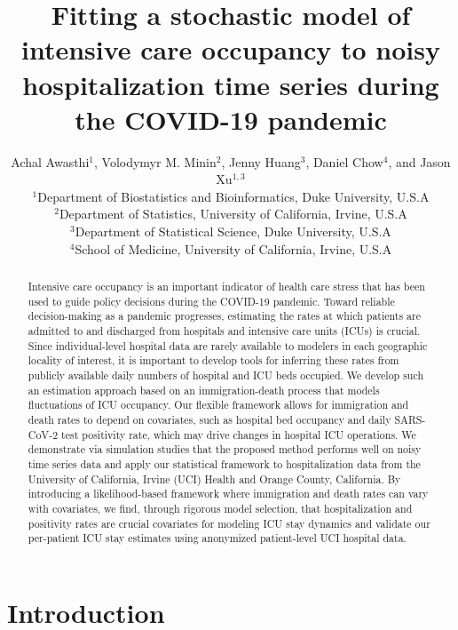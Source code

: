 \documentclass{article}
\title{Fitting a stochastic model of intensive care occupancy to noisy hospitalization time series during the COVID-19 pandemic}
\author{Achal Awasthi$^{1}$, 
Volodymyr M. Minin$^{2}$, Jenny Huang$^{3}$, Daniel Chow$^{4}$, and  Jason Xu$^{1,3}$ \\
$^{1}$Department of Biostatistics and Bioinformatics, Duke University, U.S.A\\
$^{2}$Department of Statistics, University of California, Irvine, U.S.A\\
$^{3}$Department of Statistical Science, Duke University, U.S.A\\
$^{4}$School of Medicine, University of California, Irvine, U.S.A}
\date{}
\begin{document}
\maketitle



\begin{abstract}
Intensive care occupancy is an important indicator of health care stress that has been used to guide policy decisions during the COVID-19 pandemic. Toward reliable decision-making as a pandemic progresses, estimating the rates at which patients are admitted to and discharged from hospitals and intensive care units (ICUs) is crucial. Since individual-level hospital data are rarely available to modelers in each geographic locality of interest, it is important to develop tools for inferring these rates from publicly available daily numbers of hospital and ICU beds occupied. We develop such an estimation approach based on an immigration-death process that models fluctuations of ICU occupancy. Our flexible framework allows for immigration and death rates to depend on covariates, such as hospital bed occupancy and daily SARS-CoV-2 test positivity rate, which may drive changes in hospital ICU operations. We demonstrate via simulation studies that the proposed method performs well on noisy time series data and apply our statistical framework to hospitalization data from the University of California, Irvine (UCI) Health and Orange County, California. By introducing a likelihood-based framework where immigration and death rates can vary with covariates, we find, through rigorous model selection, that hospitalization and positivity rates are crucial covariates for modeling ICU stay dynamics and validate our per-patient ICU stay estimates using anonymized patient-level UCI hospital data.
\end{abstract}


\maketitle
\section{Introduction}
\label{s:intro}
\end{document}
